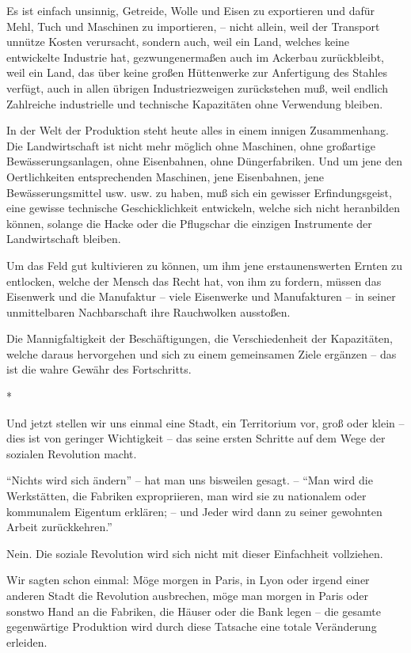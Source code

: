 \documentclass{scrbook}
\begin{document}
Es ist einfach unsinnig, Getreide, Wolle und Eisen zu exportieren und dafür Mehl, Tuch und Maschinen zu importieren, – nicht allein, weil der Transport unnütze Kosten verursacht, sondern auch, weil ein Land, welches keine entwickelte Industrie hat, gezwungenermaßen auch im Ackerbau zurückbleibt, weil ein Land, das über keine großen Hüttenwerke zur Anfertigung des Stahles verfügt, auch in allen übrigen Industriezweigen zurückstehen muß, weil endlich Zahlreiche industrielle und technische Kapazitäten ohne Verwendung bleiben.

In der Welt der Produktion steht heute alles in einem innigen Zusammenhang. Die Landwirtschaft ist nicht mehr möglich ohne Maschinen, ohne großartige Bewässerungsanlagen, ohne Eisenbahnen, ohne Düngerfabriken. Und um jene den Oertlichkeiten entsprechenden Maschinen, jene Eisenbahnen, jene Bewässerungsmittel usw. usw. zu haben, muß sich ein gewisser Erfindungsgeist, eine gewisse technische Geschicklichkeit entwickeln, welche sich nicht heranbilden können, solange die Hacke oder die Pflugschar die einzigen Instrumente der Landwirtschaft bleiben.

Um das Feld gut kultivieren zu können, um ihm jene erstaunenswerten Ernten zu entlocken, welche der Mensch das Recht hat, von ihm zu fordern, müssen das Eisenwerk und die Manufaktur – viele Eisenwerke und Manufakturen – in seiner unmittelbaren Nachbarschaft ihre Rauchwolken ausstoßen.

Die Mannigfaltigkeit der Beschäftigungen, die Verschiedenheit der Kapazitäten, welche daraus hervorgehen und sich zu einem gemeinsamen Ziele ergänzen – das ist die wahre Gewähr des Fortschritts.

\begin{center}*\end{center}

Und jetzt stellen wir uns einmal eine Stadt, ein Territorium vor, groß oder klein – dies ist von geringer Wichtigkeit – das seine ersten Schritte auf dem Wege der sozialen Revolution macht.

``Nichts wird sich ändern'' – hat man uns bisweilen gesagt. – ``Man wird die Werkstätten, die Fabriken expropriieren, man wird sie zu nationalem oder kommunalem Eigentum erklären; – und Jeder wird dann zu seiner gewohnten Arbeit zurückkehren.''

Nein. Die soziale Revolution wird sich nicht mit dieser Einfachheit vollziehen.

Wir sagten schon einmal: Möge morgen in Paris, in Lyon oder irgend einer anderen Stadt die Revolution ausbrechen, möge man morgen in Paris oder sonstwo Hand an die Fabriken, die Häuser oder die Bank legen – die gesamte gegenwärtige Produktion wird durch diese Tatsache eine totale Veränderung erleiden.
\end{document}

